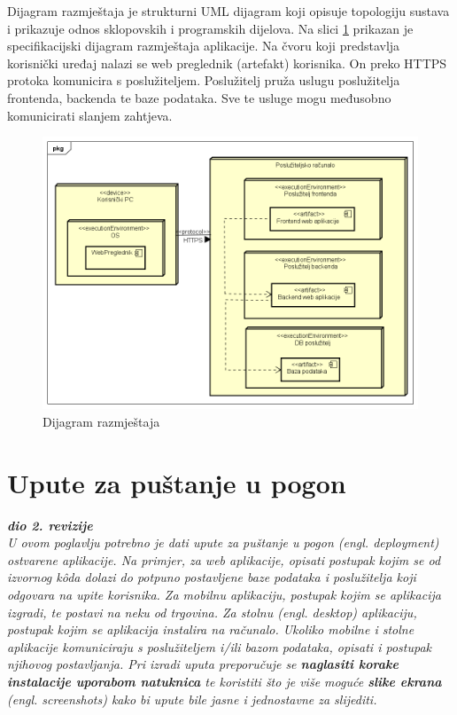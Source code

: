 			 
			 Dijagram razmještaja je strukturni UML dijagram koji opisuje topologiju sustava i prikazuje odnos sklopovskih i programskih dijelova. Na slici \ref{fig:dijagramrazmjestaja} prikazan je specifikacijski dijagram razmještaja aplikacije. Na čvoru koji predstavlja korisnički uređaj nalazi se web preglednik (artefakt) korisnika. On preko HTTPS protoka komunicira s poslužiteljem. Poslužitelj pruža uslugu poslužitelja frontenda, backenda te baze podataka. Sve te usluge mogu međusobno komunicirati slanjem zahtjeva.
			 
			 \begin{figure}[H]
			 	\includegraphics[width=\textwidth]{dijagrami/Dijagram razmjestaja.PNG} %
			 	\caption{Dijagram razmještaja}
			 	\label{fig:dijagramrazmjestaja} %
			 \end{figure}
			
			\eject 
		
		\section{Upute za puštanje u pogon}
		
			\textbf{\textit{dio 2. revizije}}\\
		
			 \textit{U ovom poglavlju potrebno je dati upute za puštanje u pogon (engl. deployment) ostvarene aplikacije. Na primjer, za web aplikacije, opisati postupak kojim se od izvornog kôda dolazi do potpuno postavljene baze podataka i poslužitelja koji odgovara na upite korisnika. Za mobilnu aplikaciju, postupak kojim se aplikacija izgradi, te postavi na neku od trgovina. Za stolnu (engl. desktop) aplikaciju, postupak kojim se aplikacija instalira na računalo. Ukoliko mobilne i stolne aplikacije komuniciraju s poslužiteljem i/ili bazom podataka, opisati i postupak njihovog postavljanja. Pri izradi uputa preporučuje se \textbf{naglasiti korake instalacije uporabom natuknica} te koristiti što je više moguće \textbf{slike ekrana} (engl. screenshots) kako bi upute bile jasne i jednostavne za slijediti.}
			
